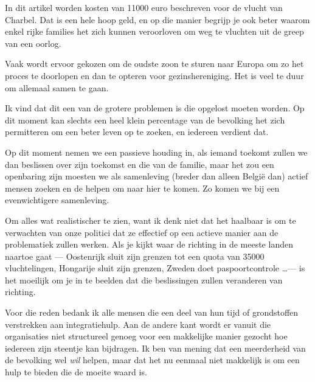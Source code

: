 \documentclass[12pt, a4paper]{paper}
\begin{document}
In dit artikel worden kosten van 11000 euro beschreven voor de vlucht van Charbel. Dat is een hele hoop geld, en op die manier begrijp je ook beter waarom enkel rijke families het zich kunnen veroorloven om weg te vluchten uit de greep van een oorlog.

Vaak wordt ervoor gekozen om de oudste zoon te sturen naar Europa om zo het proces te doorlopen en dan te opteren voor gezinshereniging. Het is veel te duur om allemaal samen te gaan.

Ik vind dat dit een van de grotere problemen is die opgelost moeten worden. Op dit moment kan slechts een heel klein percentage van de bevolking het zich permitteren om een beter leven op te zoeken, en iedereen verdient dat.

Op dit moment nemen we een passieve houding in, als iemand toekomt zullen we dan beslissen over zijn toekomst en die van de familie, maar het zou een openbaring zijn moesten we als samenleving (breder dan alleen België dan) actief mensen zoeken en de helpen om naar hier te komen. Zo komen we bij een evenwichtigere samenleving.

Om alles wat realistischer te zien, want ik denk niet dat het haalbaar is om te verwachten van onze politici dat ze effectief op een actieve manier aan de problematiek zullen werken. Als je kijkt waar de richting in de meeste landen naartoe gaat --- Oostenrijk sluit zijn grenzen tot een quota van 35000 vluchtelingen, Hongarije sluit zijn grenzen, Zweden doet paspoortcontrole \dots --- is het moeilijk om je in te beelden dat die beslissingen zullen veranderen van richting.

Voor die reden bedank ik alle mensen die een deel van hun tijd of grondstoffen verstrekken aan integratiehulp. Aan de andere kant wordt er vanuit die organisaties niet structureel genoeg voor een makkelijke manier gezocht hoe iedereen zijn steentje kan bijdragen. Ik ben van mening dat een meerderheid van de bevolking wel \emph{wil} helpen, maar dat het nu eenmaal niet makkelijk is om een hulp te bieden die de moeite waard is.
\end{document}
